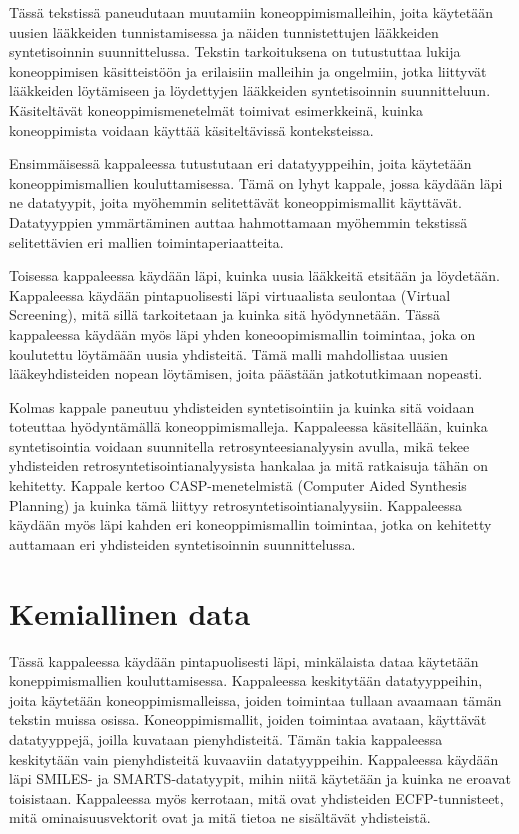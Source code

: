 \documentclass[finnish,twoside,censored,tkt,sw-line]{HYthesisML}
\begin{document}
Tässä tekstissä paneudutaan muutamiin koneoppimismalleihin, joita käytetään uusien lääkkeiden tunnistamisessa ja näiden tunnistettujen lääkkeiden syntetisoinnin suunnittelussa.
Tekstin tarkoituksena on tutustuttaa lukija koneoppimisen käsitteistöön ja erilaisiin malleihin ja ongelmiin, jotka liittyvät lääkkeiden löytämiseen ja löydettyjen lääkkeiden syntetisoinnin suunnitteluun.
Käsiteltävät koneoppimismenetelmät toimivat esimerkkeinä, kuinka koneoppimista voidaan käyttää käsiteltävissä konteksteissa.

Ensimmäisessä kappaleessa tutustutaan eri datatyyppeihin, joita käytetään koneoppimismallien kouluttamisessa.
Tämä on lyhyt kappale, jossa käydään läpi ne datatyypit, joita myöhemmin selitettävät koneoppimismallit käyttävät.
Datatyyppien ymmärtäminen auttaa hahmottamaan myöhemmin tekstissä selitettävien eri mallien toimintaperiaatteita.

Toisessa kappaleessa käydään läpi, kuinka uusia lääkkeitä etsitään ja löydetään.
Kappaleessa käydään pintapuolisesti läpi virtuaalista seulontaa (Virtual Screening), mitä sillä tarkoitetaan ja kuinka sitä hyödynnetään.
Tässä kappaleessa käydään myös läpi yhden koneoopimismallin toimintaa, joka on koulutettu löytämään uusia yhdisteitä.
Tämä malli mahdollistaa uusien lääkeyhdisteiden nopean löytämisen, joita päästään jatkotutkimaan nopeasti.

Kolmas kappale paneutuu yhdisteiden syntetisointiin ja kuinka sitä voidaan toteuttaa hyödyntämällä koneoppimismalleja.
Kappaleessa käsitellään, kuinka syntetisointia voidaan suunnitella retrosynteesianalyysin avulla, mikä tekee yhdisteiden retrosyntetisointianalyysista hankalaa ja mitä ratkaisuja tähän on kehitetty.
Kappale kertoo CASP-menetelmistä (Computer Aided Synthesis Planning) ja kuinka tämä liittyy retrosyntetisointianalyysiin.
Kappaleessa käydään myös läpi kahden eri koneoppimismallin toimintaa, jotka on kehitetty auttamaan eri yhdisteiden syntetisoinnin suunnittelussa.

\chapter{Kemiallinen data}

Tässä kappaleessa käydään pintapuolisesti läpi, minkälaista dataa käytetään koneppimismallien kouluttamisessa.
Kappaleessa keskitytään datatyyppeihin, joita käytetään koneoppimismalleissa, joiden toimintaa tullaan avaamaan tämän tekstin muissa osissa.
Koneoppimismallit, joiden toimintaa avataan, käyttävät datatyyppejä, joilla kuvataan pienyhdisteitä.
Tämän takia kappaleessa keskitytään vain pienyhdisteitä kuvaaviin datatyyppeihin.
Kappaleessa käydään läpi SMILES- ja SMARTS-datatyypit, mihin niitä käytetään ja kuinka ne eroavat toisistaan.
Kappaleessa myös kerrotaan, mitä ovat yhdisteiden ECFP-tunnisteet, mitä ominaisuusvektorit ovat ja mitä tietoa ne sisältävät yhdisteistä.
\end{document}
